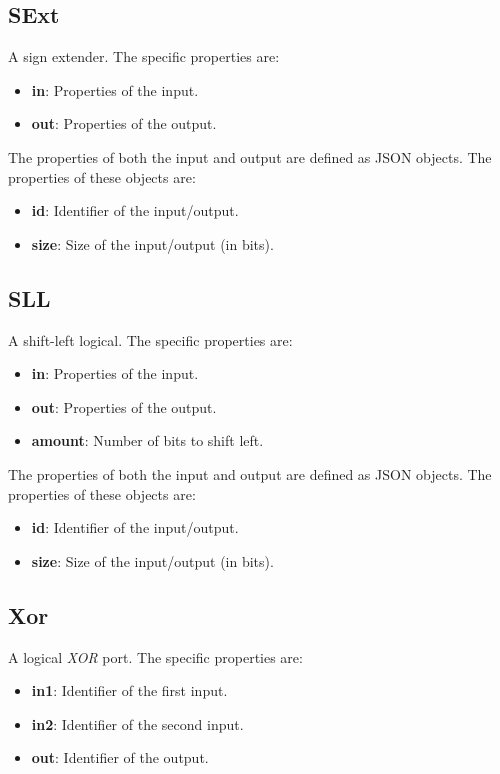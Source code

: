 \documentclass[11pt,a4paper,twoside,titlepage]{report}
\begin{document}
\subsection{SExt}

A sign extender. The specific properties are:
\begin{itemize}
	\item \textbf{in}: Properties of the input.
	\item \textbf{out}: Properties of the output.
\end{itemize}

The properties of both the input and output are defined as JSON objects. 
The properties of these objects are:
\begin{itemize}
	\item \textbf{id}: Identifier of the input/output.
	\item \textbf{size}: Size of the input/output (in bits).
\end{itemize}

\subsection{SLL}

A shift-left logical. The specific properties are:
\begin{itemize}
	\item \textbf{in}: Properties of the input.
	\item \textbf{out}: Properties of the output.
	\item \textbf{amount}: Number of bits to shift left.
\end{itemize}

The properties of both the input and output are defined as JSON objects. 
The properties of these objects are:
\begin{itemize}
	\item \textbf{id}: Identifier of the input/output.
	\item \textbf{size}: Size of the input/output (in bits).
\end{itemize}

\subsection{Xor}

A logical \emph{XOR} port. The specific properties are:
\begin{itemize}
	\item \textbf{in1}: Identifier of the first input.
	\item \textbf{in2}: Identifier of the second input.
	\item \textbf{out}: Identifier of the output.
\end{itemize}
\end{document}

